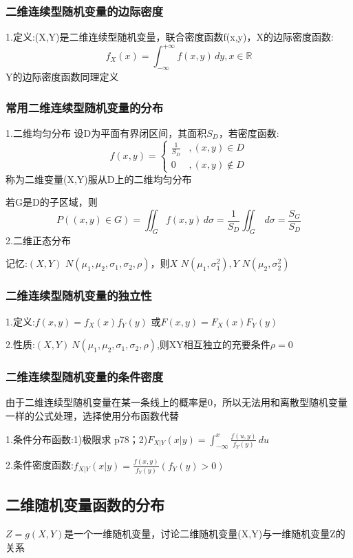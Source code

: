 \documentclass[11pt,twoside,a4paper]{ctexart}
\begin{document}
    \subsubsection{二维连续型随机变量的边际密度}
    1.定义:(X,Y)是二维连续型随机变量，联合密度函数f(x,y)，X的边际密度函数:
    \[f_X(x) = \int _{-\infty}^{+\infty}f(x,y)\,dy, x\in \mathbb{R}\]
    Y的边际密度函数同理定义

    \subsubsection{常用二维连续型随机变量的分布}
    1.二维均匀分布
    设D为平面有界闭区间，其面积$S_D$，若密度函数:
    \[f(x,y) = 
    \begin{cases}
        \frac{1}{S_D} &, (x,y)\in D \\
        0 &, (x,y)\notin D
    \end{cases}\]
    称为二维变量(X,Y)服从D上的二维均匀分布

    若G是D的子区域，则
    \[P((x,y)\in G) = \iint _G f(x,y) \, d\sigma = \frac{1}{S_D}\iint _G \,d\sigma = \frac{S_G}{S_D}\]
    2.二维正态分布

    记忆:$(X,Y)\text{~}N(\mu _1,\mu _2,\sigma _1,\sigma _2,\rho )$，则$X\text{~}N(\mu _1,\sigma _1^2),Y\text{~}N(\mu _2,\sigma _2^2)$

    \subsubsection{二维连续型随机变量的独立性}
    1.定义:$f(x,y) = f_X(x)f_Y(y)$
    或$F(x,y) = F_X(x)F_Y(y)$

    2.性质:$(X,Y)~N(\mu _1,\mu _2,\sigma _1,\sigma _2,\rho )$,则XY相互独立的充要条件$\rho = 0$
    \subsubsection{二维连续型随机变量的条件密度}
    由于二维连续型随机变量在某一条线上的概率是0，所以无法用和离散型随机变量一样的公式处理，选择使用分布函数代替

    1.条件分布函数:1)极限求 p78；2)$F_{X|Y}(x|y) = \int _{-\infty}^{x}\frac{f(u,y)}{f_Y(y)}\,du$

    2.条件密度函数:$f_{X|Y}(x|y) = \frac{f(x,y)}{f_Y(y)}  (f_Y(y) > 0)$
    \subsection{二维随机变量函数的分布}
    $Z = g(X,Y)$是一个一维随机变量，讨论二维随机变量(X,Y)与一维随机变量Z的关系
\end{document}
